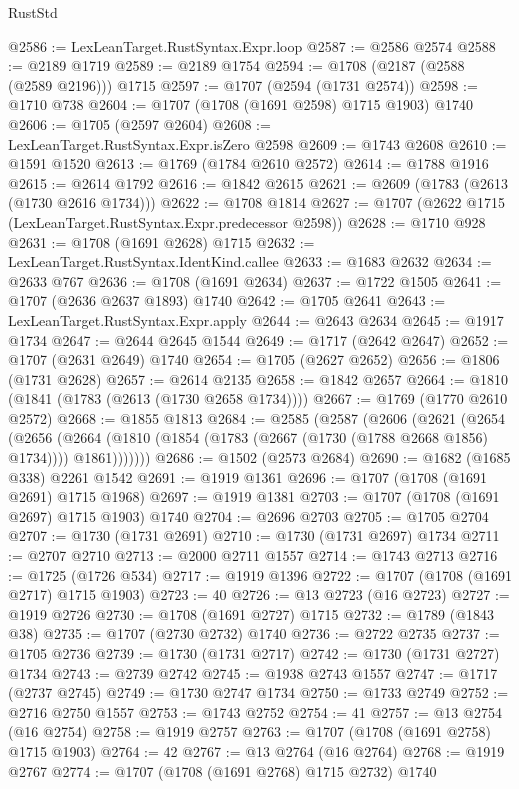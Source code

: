 \begin{lexlean}{RustStd}
\begin{coremodule}
@2586 := LexLeanTarget.RustSyntax.Expr.loop
@2587 := @2586 @2574
@2588 := @2189 @1719
@2589 := @2189 @1754
@2594 := @1708 (@2187 (@2588 (@2589 @2196))) @1715
@2597 := @1707 (@2594 (@1731 @2574))
@2598 := @1710 @738
@2604 := @1707 (@1708 (@1691 @2598) @1715 @1903) @1740
@2606 := @1705 (@2597 @2604)
@2608 := LexLeanTarget.RustSyntax.Expr.isZero @2598
@2609 := @1743 @2608
@2610 := @1591 @1520
@2613 := @1769 (@1784 @2610 @2572)
@2614 := @1788 @1916
@2615 := @2614 @1792
@2616 := @1842 @2615
@2621 := @2609 (@1783 (@2613 (@1730 @2616 @1734)))
@2622 := @1708 @1814
@2627 := @1707 (@2622 @1715 (LexLeanTarget.RustSyntax.Expr.predecessor @2598))
@2628 := @1710 @928
@2631 := @1708 (@1691 @2628) @1715
@2632 := LexLeanTarget.RustSyntax.IdentKind.callee
@2633 := @1683 @2632
@2634 := @2633 @767
@2636 := @1708 (@1691 @2634)
@2637 := @1722 @1505
@2641 := @1707 (@2636 @2637 @1893) @1740
@2642 := @1705 @2641
@2643 := LexLeanTarget.RustSyntax.Expr.apply
@2644 := @2643 @2634
@2645 := @1917 @1734
@2647 := @2644 @2645 @1544
@2649 := @1717 (@2642 @2647)
@2652 := @1707 (@2631 @2649) @1740
@2654 := @1705 (@2627 @2652)
@2656 := @1806 (@1731 @2628)
@2657 := @2614 @2135
@2658 := @1842 @2657
@2664 := @1810 (@1841 (@1783 (@2613 (@1730 @2658 @1734))))
@2667 := @1769 (@1770 @2610 @2572)
@2668 := @1855 @1813
@2684 := @2585
    (@2587
      (@2606
        (@2621
          (@2654
            (@2656
              (@2664 (@1810 (@1854 (@1783 (@2667 (@1730 (@1788 @2668 @1856) @1734)))) @1861)))))))
@2686 := @1502 (@2573 @2684)
@2690 := @1682 (@1685 @338) @2261 @1542
@2691 := @1919 @1361
@2696 := @1707 (@1708 (@1691 @2691) @1715 @1968)
@2697 := @1919 @1381
@2703 := @1707 (@1708 (@1691 @2697) @1715 @1903) @1740
@2704 := @2696 @2703
@2705 := @1705 @2704
@2707 := @1730 (@1731 @2691)
@2710 := @1730 (@1731 @2697) @1734
@2711 := @2707 @2710
@2713 := @2000 @2711 @1557
@2714 := @1743 @2713
@2716 := @1725 (@1726 @534)
@2717 := @1919 @1396
@2722 := @1707 (@1708 (@1691 @2717) @1715 @1903)
@2723 := 40
@2726 := @13 @2723 (@16 @2723)
@2727 := @1919 @2726
@2730 := @1708 (@1691 @2727) @1715
@2732 := @1789 (@1843 @38)
@2735 := @1707 (@2730 @2732) @1740
@2736 := @2722 @2735
@2737 := @1705 @2736
@2739 := @1730 (@1731 @2717)
@2742 := @1730 (@1731 @2727) @1734
@2743 := @2739 @2742
@2745 := @1938 @2743 @1557
@2747 := @1717 (@2737 @2745)
@2749 := @1730 @2747 @1734
@2750 := @1733 @2749
@2752 := @2716 @2750 @1557
@2753 := @1743 @2752
@2754 := 41
@2757 := @13 @2754 (@16 @2754)
@2758 := @1919 @2757
@2763 := @1707 (@1708 (@1691 @2758) @1715 @1903)
@2764 := 42
@2767 := @13 @2764 (@16 @2764)
@2768 := @1919 @2767
@2774 := @1707 (@1708 (@1691 @2768) @1715 @2732) @1740

\end{coremodule}
\end{lexlean}
